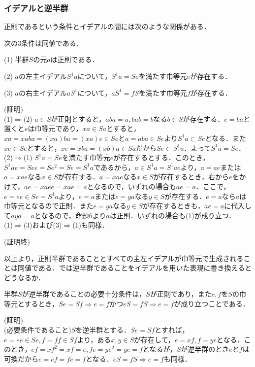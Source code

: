 \documentclass{jsarticle}
\begin{document}
\subsubsection{イデアルと逆半群}
正則であるという条件とイデアルの間には次のような関係がある．
\begin{prop}
次の3条件は同値である．
\begin{description}
\item{(1)} 半群$S$の元$a$は正則である．
\item{(2)} $a$の左主イデアル$S^1a$について，$S^1a=Se$を満たす巾等元$e$が存在する．
\item{(3)} $a$の右主イデアル$aS^1$について，$aS^1=fS$を満たす巾等元$f$が存在する．
\end{description}
\end{prop}
(証明)\\
(1)$\Rightarrow$(2) $a\in S$が正則とすると，$aba=a,bab=b$なる$b\in S$が存在する．$e=ba$と置くと$e$は巾等元であり，$xa\in Sa$とすると，$xa=xaba=(xa)ba=(xa)e\in Se$と$a=aba\in Se$より$S^1a\subset Se$となる．また$xe\in Se$とすると，$xe=xba=(xb)a\in Sa$だから$Se\subset S^1a$．よって$S^1a=Se$．\\
(2)$\Rightarrow$(1) $S^1a=Se$を満たす巾等元$e$が存在するとする．このとき，$S^1ae=See=Se^2=Se=S^1a$であるから，$a\in S^1a=S^1ae$より，$a=ae$または$a=xae$なる$x\in S$が存在する．$a=xae$なる$x\in S$が存在するとき，右から$e$をかけて，$ae=xaee=xae=a$となるので，いずれの場合も$ae=a$．ここで，$e=ee\in Se=S^1a$より，$e=a$または$e=ya$なる$y\in S$が存在する．$e=a$なら$a$は巾等元となるので正則．また$e=ya$なる$y\in S$が存在するときも，$ae=a$に代入して$aya=a$となるので，命題6より$a$は正則．いずれの場合も(1)が成り立つ．\\
(1)$\Rightarrow$(3)および(3)$\Rightarrow$(1)も同様．
\begin{flushright}
(証明終)
\end{flushright}
以上より，正則半群であることとすべての主左イデアルが巾等元で生成されることは同値である．では逆半群であることをイデアルを用いた表現に書き換えるとどうなるか．
\begin{thm}
半群$S$が逆半群であることの必要十分条件は，$S$が正則であり，また$e,f$を$S$の巾等元とするとき，$Se=Sf\Rightarrow e=f$かつ$eS=fS\Rightarrow e=f$が成り立つことである．
\end{thm}
(証明)\\
(必要条件であること)$S$を逆半群とする．$Se=Sf$とすれば，$e=ee\in Se, f=ff\in Sf$より，ある$x,y\in S$が存在して，$e=xf,f=ye$となる．このとき，$ef=xf^2=xf=e,fe=ye^2=ye=f$となるが，$S$が逆半群のとき$e$と$f$は可換だから$e=ef=fe=f$となる．$eS=fS\Rightarrow e=f$も同様．\\
\end{document}
